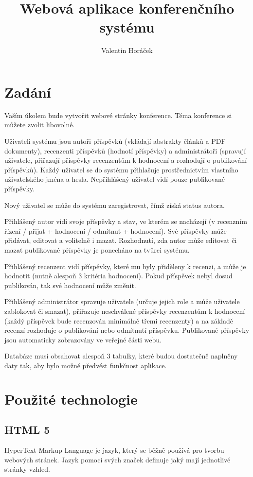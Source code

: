 \documentclass[czech,SP]{thesiskiv}
\author{Valentin Horáček}
\title{Webová aplikace konferenčního systému}
\begin{document}
\maketitle
\tableofcontents
%
%
\chapter{Zadání}
\par
Vaším úkolem bude vytvořit webové stránky konference.  Téma konference si můžete zvolit libovolné.
\par
Uživateli systému jsou autoři příspěvků (vkládají abstrakty článků a PDF dokumenty), recenzenti příspěvků 
(hodnotí příspěvky) a administrátoři (spravují uživatele, přiřazují příspěvky recenzentům k hodnocení a 
rozhodují o publikování příspěvků). Každý uživatel se do systému přihlašuje prostřednictvím vlastního 
uživatelského jména a hesla. Nepřihlášený uživatel vidí pouze publikované příspěvky.
\par
Nový uživatel se může do systému zaregistrovat, čímž získá status autora.
\par
Přihlášený autor vidí svoje příspěvky a stav, ve kterém se nacházejí (v recenzním řízení 
/ přijat + hodnocení / odmítnut + hodnocení). Své příspěvky může přidávat, editovat a volitelně i mazat. 
Rozhodnutí, zda autor může editovat či mazat publikované příspěvky je ponecháno na tvůrci systému.
\par
Přihlášený recenzent vidí příspěvky, které mu byly přiděleny k recenzi, a může je hodnotit 
(nutně alespoň 3 kritéria hodnocení). Pokud příspěvek nebyl dosud publikován, tak své hodnocení může změnit.
\par
Přihlášený administrátor spravuje uživatele (určuje jejich role a může uživatele zablokovat či smazat), 
přiřazuje neschválené příspěvky recenzentům k hodnocení (každý příspěvek bude recenzován minimálně třemi 
recenzenty) a na základě recenzí rozhoduje o publikování nebo odmítnutí příspěvku. 
Publikované příspěvky jsou automaticky zobrazovány ve veřejné části webu.
\par
Databáze musí obsahovat alespoň 3 tabulky, které budou dostatečně naplněny daty tak, aby bylo možné 
předvést funkčnost aplikace.

%
%
\chapter{Použité technologie}
\section{HTML 5}
\par
HyperText Markup Language je jazyk, který se běžně používá pro tvorbu webových stránek. Jazyk pomocí svých
značek definuje jaký mají jednotlivé stránky vzhled.
\end{document}
